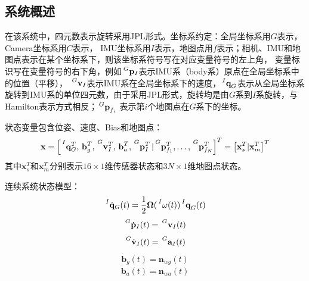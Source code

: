 \documentclass{article}
\begin{document}
\subsection{系统概述}
在该系统中，四元数表示旋转采用JPL形式。坐标系约定：全局坐标系用$G$表示，Camera坐标系用$C$表示，
IMU坐标系用$I$表示，地图点用$f$表示；相机、IMU和地图点表示在某个坐标系下，则该坐标系符号写在对应变量符号的左上角，
变量标识写在变量符号的右下角，例如$\sideset{^G}{}{\mathop{\mathbf{p}_{I}}}$表示IMU系（body系）原点在全局坐标系中的位置（平移），
$\sideset{^G}{}{\mathop{\textbf{v}_{I}}}$表示IMU系在全局坐标系下的速度，$\sideset{^I}{}{\mathop{\textbf{q}_{G}}}$表示从全局坐标系
旋转到IMU系的单位四元数，由于采用JPL形式，旋转均是由$G$系到$I$系旋转，与Hamilton表示方式相反；$\sideset{^G}{}{\mathop{\textbf{p}_{f_i}}}$
表示第$i$个地图点在$G$系下的坐标。
\par
状态变量包含位姿、速度、Bias和地图点：
\begin{equation}
    \textbf{x}=\left[\sideset{^I}{}{\mathop{\textbf{q}_{G}^{T}}},
    \sideset{}{}{\mathop{\textbf{b}_{g}^{T}}},
    \sideset{^G}{}{\mathop{\textbf{v}_{I}^{T}}},
    \sideset{}{}{\mathop{\textbf{b}_{a}^{T}}},
    \sideset{^G}{}{\mathop{\textbf{p}_{I}^{T}}}|
    \sideset{^G}{}{\mathop{\textbf{p}_{f_1}^{T}}},
    \dots,
    \sideset{^G}{}{\mathop{\textbf{p}_{f_N}^{T}}}
    \right]^T
    =\left[\textbf{x}_{s}^{T} | \textbf{x}_{m}^{T}\right]^T
\end{equation}
其中$\textbf{x}_{s}^{T}$和$\textbf{x}_{m}^{T}$分别表示$16\times 1$维传感器状态和$3N\times 1$维地图点状态。
\par
连续系统状态模型：
\begin{equation}
    \sideset{^I}{}{\mathop{\dot{\mathbf{q}}_{G}(t)}}=\frac{1}{2}\mathbf{\Omega}(\sideset{^I}{}{\mathop{\omega(t)}})\sideset{^I}{}{\mathop{\textbf{q}_{G}(t)}}
\end{equation}
\begin{equation}
    \sideset{^G}{}{\mathop{\dot{\mathbf{p}}_{I}(t)}}=\sideset{^G}{}{\mathop{\textbf{v}_{I}(t)}}
\end{equation}
\begin{equation}
    \sideset{^G}{}{\mathop{\dot{\mathbf{v}}_{I}(t)}}=\sideset{^G}{}{\mathop{\textbf{a}_{I}(t)}}
\end{equation}
\begin{equation}
    \dot{\mathbf{b}}_{g}(t)=\textbf{n}_{wg}(t)
\end{equation}
\begin{equation}
    \dot{\mathbf{b}}_{a}(t)=\textbf{n}_{wa}(t)
\end{equation}
\end{document}
